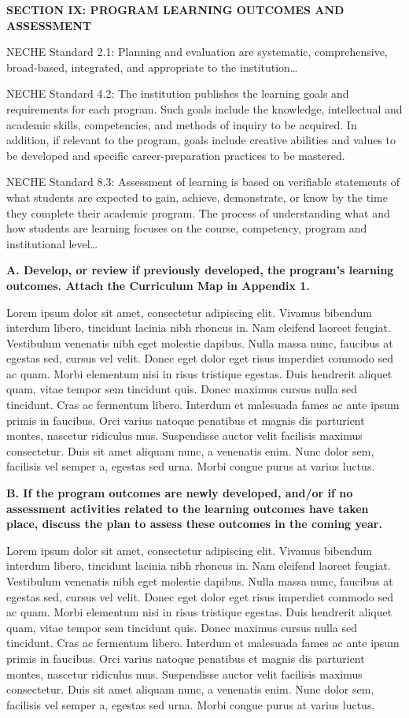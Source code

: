 \textbf{SECTION IX: PROGRAM LEARNING OUTCOMES AND ASSESSMENT}

NECHE Standard 2.1: Planning and evaluation are systematic, comprehensive, broad-based, integrated, and appropriate to the institution…

NECHE Standard 4.2: The institution publishes the learning goals and requirements for each program. Such goals include the knowledge, intellectual and academic skills, competencies, and methods of inquiry to be acquired. In addition, if relevant to the program, goals include creative abilities and values to be developed and specific career-preparation practices to be mastered.

NECHE Standard 8.3: Assessment of learning is based on verifiable statements of what students are expected to gain, achieve, demonstrate, or know by the time they complete their academic program. The process of understanding what and how students are learning focuses on the course, competency, program and institutional level…

\textbf{A. Develop, or review if previously developed, the program’s learning outcomes. Attach the Curriculum Map in Appendix 1.}

Lorem ipsum dolor sit amet, consectetur adipiscing elit. Vivamus bibendum interdum libero, tincidunt lacinia nibh rhoncus in. Nam eleifend laoreet feugiat. Vestibulum venenatis nibh eget molestie dapibus. Nulla massa nunc, faucibus at egestas sed, cursus vel velit. Donec eget dolor eget risus imperdiet commodo sed ac quam. Morbi elementum nisi in risus tristique egestas. Duis hendrerit aliquet quam, vitae tempor sem tincidunt quis. Donec maximus cursus nulla sed tincidunt. Cras ac fermentum libero. Interdum et malesuada fames ac ante ipsum primis in faucibus. Orci varius natoque penatibus et magnis dis parturient montes, nascetur ridiculus mus. Suspendisse auctor velit facilisis maximus consectetur. Duis sit amet aliquam nunc, a venenatis enim. Nunc dolor sem, facilisis vel semper a, egestas sed urna. Morbi congue purus at varius luctus. 


\textbf{B. If the program outcomes are newly developed, and/or if no assessment activities related to the learning outcomes have taken place, discuss the plan to assess these outcomes in the coming year. }

Lorem ipsum dolor sit amet, consectetur adipiscing elit. Vivamus bibendum interdum libero, tincidunt lacinia nibh rhoncus in. Nam eleifend laoreet feugiat. Vestibulum venenatis nibh eget molestie dapibus. Nulla massa nunc, faucibus at egestas sed, cursus vel velit. Donec eget dolor eget risus imperdiet commodo sed ac quam. Morbi elementum nisi in risus tristique egestas. Duis hendrerit aliquet quam, vitae tempor sem tincidunt quis. Donec maximus cursus nulla sed tincidunt. Cras ac fermentum libero. Interdum et malesuada fames ac ante ipsum primis in faucibus. Orci varius natoque penatibus et magnis dis parturient montes, nascetur ridiculus mus. Suspendisse auctor velit facilisis maximus consectetur. Duis sit amet aliquam nunc, a venenatis enim. Nunc dolor sem, facilisis vel semper a, egestas sed urna. Morbi congue purus at varius luctus. 

